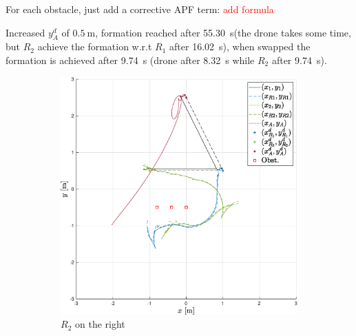 \documentclass{ifacconf}
\begin{document}
For each obstacle, just add a corrective APF term: \textcolor{red}{add formula}

Increased $y_A^d$ of $\SI{0.5}{\meter}$, 
formation reached after \SI{55.30}{\second}(the drone 
takes some time, but $R_2$ achieve the formation w.r.t 
$R_1$ after \SI{16.02}{\second}), when swapped
the formation is achieved after \SI{9.74}{\second} 
(drone after \SI{8.32}{\second}
while $R_2$ after \SI{9.74}{\second}).


\begin{figure}[h!]
    \centering
    \begin{subfigure}[b]{0.31\columnwidth}
        \centering
        \includegraphics[width=\linewidth]{images/experiment/static_obstacles/1st_scenario_obs_exp.eps}
        \caption{$R_2$ on the right}
    \end{subfigure}
    \begin{subfigure}[b]{0.31\columnwidth}
        \centering

\end{subfigure}
\end{figure}
\end{document}
